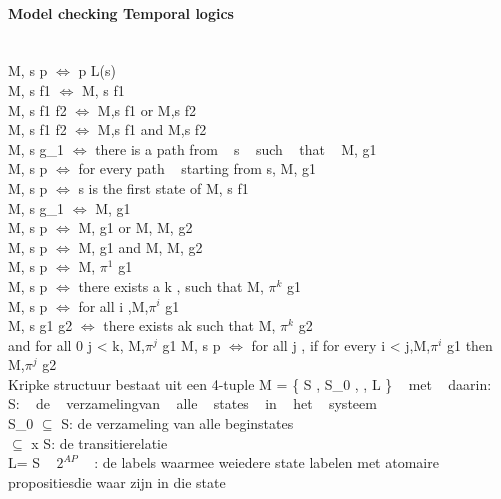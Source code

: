 \documentclass{article}
\begin{document}
 \paragraph{Model checking Temporal logics} \\
 M, s \models p $\Leftrightarrow$ p \in L(s) \\
 M, s \models \not f1 $\Leftrightarrow$ M, s \nvdash f1 \\
 M, s \models f1 \vee f2 $\Leftrightarrow$ M,s \models f1 or M,s \nvdash f2 \\
 M, s \models f1 \wedge f2 $\Leftrightarrow$  M,s \models f1 and M,s \nvdash f2 \\
 M, s \models {} g_{1} $\Leftrightarrow$ there is a path \pi  from ~  s ~   such ~  that  ~ M, \pi \models g1 \\
 M, s \models p $\Leftrightarrow$ for every path \pi  ~ starting from s, M, \pi \models g1 \\
 M, s \models p $\Leftrightarrow$ s is the first state of \piand M, s \models f1 \\
 M, s \models \not g_{1} $\Leftrightarrow$ M, \pi  \nvdash g1\\
 M, s \models p $\Leftrightarrow$  M, \pi  \models g1  or  M, \pi  M, \pi  \models g2\\
 M, s \models p $\Leftrightarrow$ M, \pi  \models g1  and  M, \pi  M, \pi  \models g2 \\
 M, s \models p $\Leftrightarrow$ M, $\pi^{1}$ \models g1 \\
 M, s \models p $\Leftrightarrow$ there exists a k , such that M, $\pi^{k}$  \models g1\\
 M, s \models p $\Leftrightarrow$ for all i ,M,$\pi^{i}$ \models g1 \\
 M, s \models g1 \bugcup g2 $\Leftrightarrow$ there exists ak  such that M, $\pi^{k}$ \models g2\\
 and for all 0 \le j < k, M,$\pi^{j}$ \models g1
 M, s \models p $\Leftrightarrow$ for all j , if for every i < j,M,$\pi^{i}$ \nvdash g1 then M,$\pi^{j}$ \models g2\\
 
 
 
 

 
 Kripke structuur
    bestaat uit  een 4-tuple M = \{ S ,  S_{0}  , \Re , L \} ~ met ~  daarin: \\
  S:  ~ de  ~ verzamelingvan ~  alle ~  states ~  in  ~ het ~  systeem \\
  S_{0} $\subseteq$ S: de verzameling van alle beginstates \\
  \Re $\subseteq$  x S: de transitierelatie \\
      L= S \to   ~ $2^{AP}$ ~ : de labels waarmee weiedere state labelen met atomaire propositiesdie waar zijn in die state\\
\end{document}
